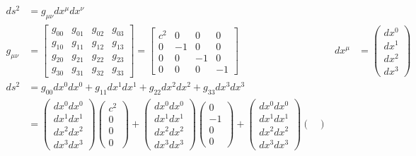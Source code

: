 \documentclass[pagesize,headsepline,10pt,parskip=half,BCOR=12mm]{scrreprt}
\begin{document}
      \begin{align*}
ds^2 &= g_{\mu\nu} dx^\mu dx^\nu \\
g_{\mu\nu} &= \begin{bmatrix}
g_{00} & g_{01} & g_{02} & g_{03}\\
g_{10} & g_{11} & g_{12} & g_{13}\\
g_{20} & g_{21} & g_{22} & g_{23}\\
g_{30} & g_{31} & g_{32} & g_{33}
\end{bmatrix} = \begin{bmatrix}
c^2 & 0 & 0 & 0\\
0 & -1 & 0 & 0\\
0 & 0 & -1 & 0\\
0 & 0 & 0 & -1
\end{bmatrix} &
dx^{\mu} &= \begin{pmatrix}
dx^0\\
dx^1\\
dx^2\\
dx^3
\end{pmatrix}\\
ds^2 &= g_{00} dx^0 dx^0 + g_{11} dx^1 dx^1 + g_{22} dx^2 dx^2
+ g_{33} dx^3 dx^3\\
&= \begin{pmatrix}
dx^0 dx^0\\
dx^1 dx^1\\
dx^2 dx^2\\
dx^3 dx^3
\end{pmatrix} \begin{pmatrix}
c^2\\
0\\
0\\
0
\end{pmatrix} + \begin{pmatrix}
dx^0 dx^0\\
dx^1 dx^1\\
dx^2 dx^2\\
dx^3 dx^3
\end{pmatrix} \begin{pmatrix}
0\\
-1\\
0\\
0
\end{pmatrix} + \begin{pmatrix}
dx^0 dx^0\\
dx^1 dx^1\\
dx^2 dx^2\\
dx^3 dx^3
\end{pmatrix} \begin{pmatrix}

\end{pmatrix}
\end{align*}
\end{document}

